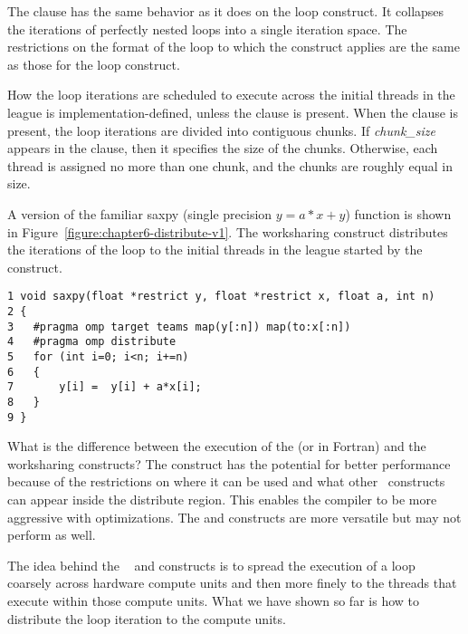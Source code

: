 The  clause has the same behavior as it does on the loop
construct.  It collapses the iterations of perfectly nested loops into a single
iteration space.
The restrictions on the format of the loop to which the construct applies are
the same as those for the loop construct.

How the loop iterations are scheduled to execute across the initial threads in
the league is implementation-defined, unless the  clause is
present.
When the  clause is present, the loop iterations
are divided into contiguous chunks. If \emph{chunk\_size} appears in the
clause, then it specifies the size of the chunks.  Otherwise, each thread is
assigned no more than one chunk, and the chunks are roughly equal in size.

A version of the familiar saxpy (single precision $y=a*x+y$) function is
shown in Figure~\ref{figure:chapter6-distribute-v1}.  The 
worksharing construct distributes the iterations of the loop to the
initial threads in the league started by the  construct.

\begin{figure*}[!tb]
\begin{verbatim}
1 void saxpy(float *restrict y, float *restrict x, float a, int n)
2 {
3   #pragma omp target teams map(y[:n]) map(to:x[:n]) 
4   #pragma omp distribute
5   for (int i=0; i<n; i+=n)
6   {
7       y[i] =  y[i] + a*x[i];
8   }
9 }
\end{verbatim}
\caption{ \textbf {Example of the distribute worksharing construct} -- \small
          Each initial thread created by the target teams construct 
          executes a subset of the iterations in the loop's iteration space.
         }
\label{figure:chapter6-distribute-v1}
\end{figure*}

What is the difference between the execution of the  (or  in Fortran) and the
 worksharing constructs? The  construct has the potential
for better performance because of the restrictions on where it can be used and
what other \OMP\ constructs can appear inside the distribute region.  This
enables the compiler to be more aggressive with optimizations.  The
 and  constructs are more versatile but may not perform as well.  

The idea behind the ~ and  constructs is to
spread the execution of a loop coarsely across hardware compute units and
then more finely to the threads that execute within those compute units.  What
we have shown so far is how to distribute the loop iteration to the compute
units.

